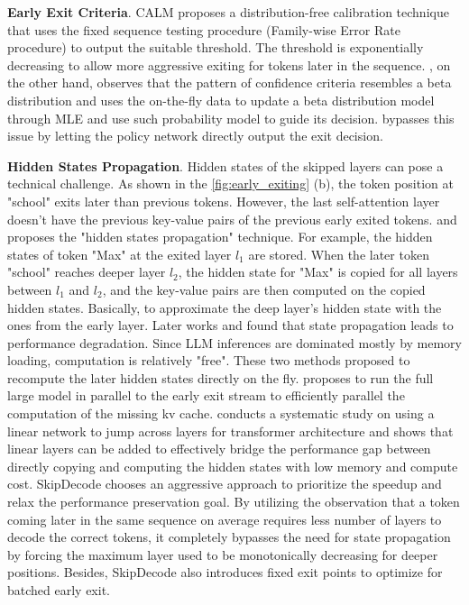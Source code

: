 \textbf{Early Exit Criteria}. CALM \cite{schuster2022confident} proposes a distribution-free calibration technique that uses the fixed sequence testing procedure (Family-wise Error Rate procedure) to output the suitable threshold. The threshold is exponentially decreasing to allow more aggressive exiting for tokens later in the sequence. \cite{bae2023fast}, on the other hand, observes that the pattern of confidence criteria resembles a beta distribution and uses the on-the-fly data to update a beta distribution model through MLE and use such probability model to guide its decision.
\cite{zeng2023consistentee} bypasses this issue by letting the policy network directly output the exit decision. 

\textbf{Hidden States Propagation}.
Hidden states of the skipped layers can pose a technical challenge. As shown in the \ref{fig:early_exiting} (b), the token position at "school" exits later than previous tokens. However, the last self-attention layer doesn't have the previous key-value pairs of the previous early exited tokens. \cite{elbayad2020depthadaptive} and \cite{schuster2022confident} proposes the "hidden states propagation" technique. For example, the hidden states of token "Max" at the exited layer $l_1$ are stored. When the later token "school" reaches deeper layer $l_2$, the hidden state for "Max" is copied for all layers between $l_1$ and $l_2$, and the key-value pairs are then computed on the copied hidden states. Basically, to approximate the deep layer's hidden state with the ones from the early layer. Later works \cite{bae2023fast} and \cite{ding2023efficiency} found that state propagation leads to performance degradation. Since LLM inferences are dominated mostly by memory loading, computation is relatively "free". These two methods proposed to recompute the later hidden states directly on the fly. \cite{chen2023eellm} proposes to run the full large model in parallel to the early exit stream to efficiently parallel the computation of the missing kv cache. \cite{din2023jump} conducts a systematic study on using a linear network to jump across layers for transformer architecture and shows that linear layers can be added to effectively bridge the performance gap between directly copying and computing the hidden states with low memory and compute cost. 
SkipDecode \cite{delcorro2023skipdecode} chooses an aggressive approach to prioritize the speedup and relax the performance preservation goal. By utilizing the observation that a token coming later in the same sequence on average requires less number of layers to decode the correct tokens, it completely bypasses the need for state propagation by forcing the maximum layer used to be monotonically decreasing for deeper positions. Besides, SkipDecode also introduces fixed exit points to optimize for batched early exit. 

